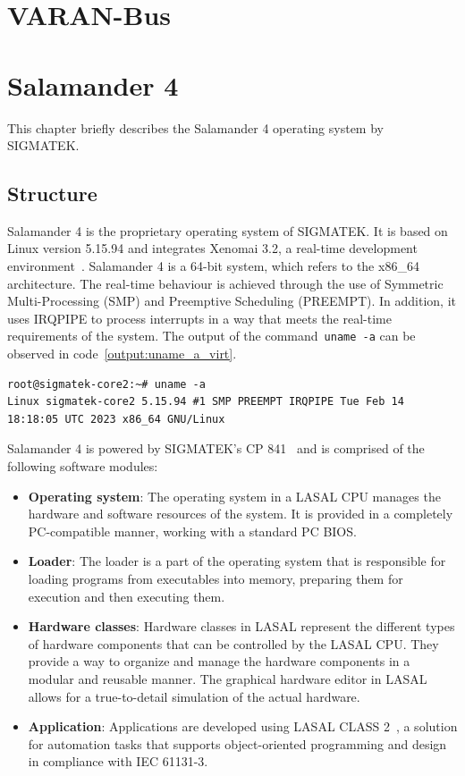 \documentclass[MMR,Master,english]{twbook}
\begin{document}
\section{VARAN-Bus}\label{sec:varan}

\section{Salamander 4}\label{cha:salamander4}
This chapter briefly describes the Salamander 4 operating system by SIGMATEK.

\subsection{Structure}
\noindent Salamander 4 is the proprietary operating system of SIGMATEK. It is based on Linux version 5.15.94 and integrates Xenomai 3.2, a real-time development environment~\cite{XenomaiXenomai}. Salamander 4 is a 64-bit system, which refers to the x86\_64 architecture. The real-time behaviour is achieved through the use of Symmetric Multi-Processing (SMP) and Preemptive Scheduling (PREEMPT). In addition, it uses IRQPIPE to process interrupts in a way that meets the real-time requirements of the system. The output of the command~\texttt{uname -a} can be observed in code~\ref{output:uname_a_virt}.

\vspace{1em}
\begin{minipage}{0.95\columnwidth}
	\begin{lstlisting}[name={System information},label={output:uname_a_virt}]
root@sigmatek-core2:~# uname -a
Linux sigmatek-core2 5.15.94 #1 SMP PREEMPT IRQPIPE Tue Feb 14 18:18:05 UTC 2023 x86_64 GNU/Linux
\end{lstlisting}
\end{minipage}

\noindent Salamander 4 is powered by SIGMATEK's CP 841~\cite{CPUEinheitenSIGMATEK} and is comprised of the following software modules:

\begin{itemize}
	\item \textbf{Operating system}: The operating system in a LASAL CPU manages the hardware and software resources of the system. It is provided in a completely PC-compatible manner, working with a standard PC BIOS.
	\item \textbf{Loader}: The loader is a part of the operating system that is responsible for loading programs from executables into memory, preparing them for execution and then executing them.
	\item \textbf{Hardware classes}: Hardware classes in LASAL represent the different types of hardware components that can be controlled by the LASAL CPU. They provide a way to organize and manage the hardware components in a modular and reusable manner. The graphical hardware editor in LASAL allows for a true-to-detail simulation of the actual hardware.
	\item \textbf{Application}: Applications are developed using LASAL CLASS 2~\cite{EngineeringToolLASAL}, a solution for automation tasks that supports object-oriented programming and design in compliance with IEC 61131-3.
\end{itemize}
\end{document}
